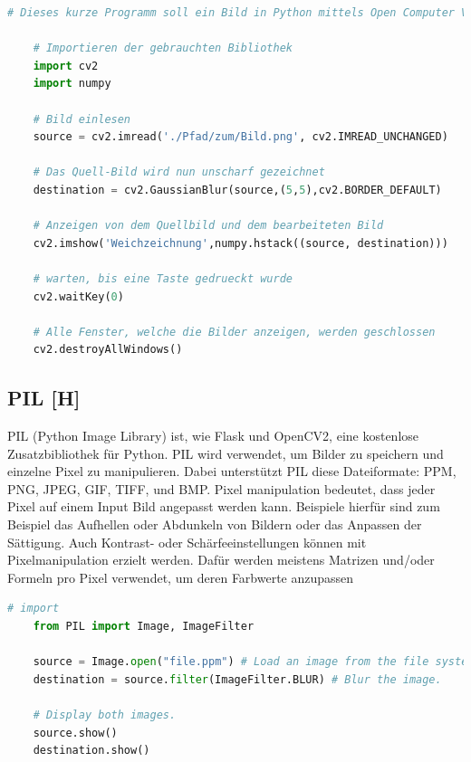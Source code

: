 \begin{lstlisting}[language=Python,caption=OpenCV Demo,label=lst:tech:gaussianBlur]
    # Dieses kurze Programm soll ein Bild in Python mittels Open Computer Vision weichzeichnen
    
    # Importieren der gebrauchten Bibliothek
    import cv2
    import numpy
    
    # Bild einlesen
    source = cv2.imread('./Pfad/zum/Bild.png', cv2.IMREAD_UNCHANGED)
    
    # Das Quell-Bild wird nun unscharf gezeichnet
    destination = cv2.GaussianBlur(source,(5,5),cv2.BORDER_DEFAULT)

    # Anzeigen von dem Quellbild und dem bearbeiteten Bild 
    cv2.imshow('Weichzeichnung',numpy.hstack((source, destination)))

    # warten, bis eine Taste gedrueckt wurde
    cv2.waitKey(0) 

    # Alle Fenster, welche die Bilder anzeigen, werden geschlossen
    cv2.destroyAllWindows() 
\end{lstlisting}


\subsection{PIL [H]}
PIL (Python Image Library) ist, wie Flask und OpenCV2, eine kostenlose Zusatzbibliothek für Python.
PIL wird verwendet, um Bilder zu speichern und einzelne Pixel zu manipulieren. Dabei unterstützt PIL diese
Dateiformate: PPM, PNG, JPEG, GIF, TIFF, und BMP. Pixel manipulation bedeutet, dass jeder Pixel auf einem
Input Bild angepasst werden kann. Beispiele hierfür sind zum Beispiel das Aufhellen oder Abdunkeln von
Bildern oder das Anpassen der Sättigung. Auch Kontrast- oder Schärfeeinstellungen können mit
Pixelmanipulation erzielt werden. Dafür werden meistens Matrizen und/oder Formeln pro Pixel verwendet, um
deren Farbwerte anzupassen
\\



\begin{lstlisting}[language=Python,caption=PIL Demo,label=lst:tech:PIL]
    # import
    from PIL import Image, ImageFilter  

    source = Image.open("file.ppm") # Load an image from the file system.
    destination = source.filter(ImageFilter.BLUR) # Blur the image.

    # Display both images.
    source.show() 
    destination.show()
\end{lstlisting}



